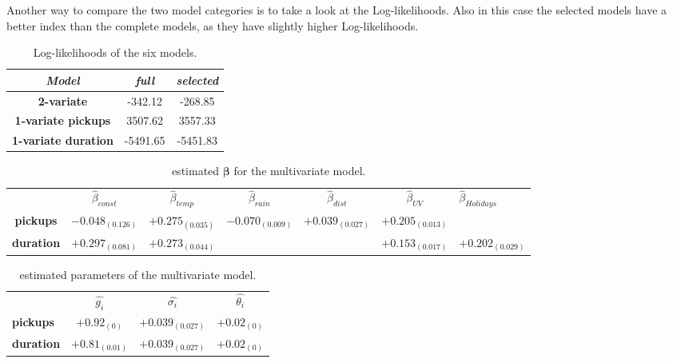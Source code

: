 \noindent
Another way to compare the two model categories is to take a look at the Log-likelihoods. Also in this case the selected models have a better index than the complete models, as they have slightly higher Log-likelihoods.

\begin{table}[h!]
	\centering
	\renewcommand\arraystretch{1.3}
	\begin{tabular}{c|c|c}
		\hline
		\textit{Model} &\textit{full } & \textit{selected} \\ 
		\hline
		\textbf{2-variate } & -342.12  & -268.85    \\ 
		\hline
		\textbf{1-variate pickups } & 3507.62  & 3557.33    \\ 
		\hline
		\textbf{1-variate duration} & -5491.65  & -5451.83   \\ 
		\hline
	\end{tabular}
	\caption[Log-likelihoods of the six models (HDGM)]{Log-likelihoods of the six models.}
	\label{Log-likelihoods HDGM}
\end{table}

\begin{table}[h!]
	\centering
	\renewcommand\arraystretch{1.3}
	\begin{tabular}{|ccccccl}
		\hline
		& $\hat{\beta}_{const}$  & $\hat{\beta}_{temp}$ & $\hat{\beta}_{rain}$ & $\hat{\beta}_{dist}$ & $\hat{\beta}_{UV}$ &$\hat{\beta}_{Holidays}$      \\ \cline{2-7} 
		\multicolumn{1}{|c|}{\textbf{pickups}}  & $-0.048_{(0.126)}$ & $+0.275_{(0.035)}$ & $-0.070_{(0.009)}$ & $+0.039_{(0.027)}$ & $+0.205_{(0.013)}$ &              \\
		\multicolumn{1}{|c|}{\textbf{duration}} & $+0.297_{(0.081)}$  & $+0.273_{(0.044)}$ &               &               & $+0.153_{(0.017)}$  & $+0.202_{(0.029)}$
	\end{tabular}
	\caption[Estimated $\boldsymbol{\beta}$ for the multivariate model (HDGM)]{estimated $\boldsymbol{\beta}$ for the multivariate model.}
	\label{Bivariate Beta HDGM}
\end{table}

\begin{table}[h!]
	\centering
	\renewcommand\arraystretch{1.3}
	\begin{tabular}{|cccc}
		\hline
		& $\hat{g_i}$  & $\hat{\sigma_i}$ & $\hat{\theta_i}$  \\ \cline{2-4} 
		\multicolumn{1}{|l|}{\textbf{pickups}}  &  $+0.92_{(0)}$ &  $+0.039_{(0.027)}$ & \multicolumn{1}{c}{$+0.02_{(0)}$ } \\
		\multicolumn{1}{|l|}{\textbf{duration}} &  $+0.81_{(0.01)}$ &  $+0.039_{(0.027)}$ &     $+0.02_{(0)}$                              
	\end{tabular}
	\caption[Estimated parameters of the multivariate model (HDGM)]{estimated parameters of the multivariate model.}
	\label{Bivariate Param_HDGM}
\end{table}

